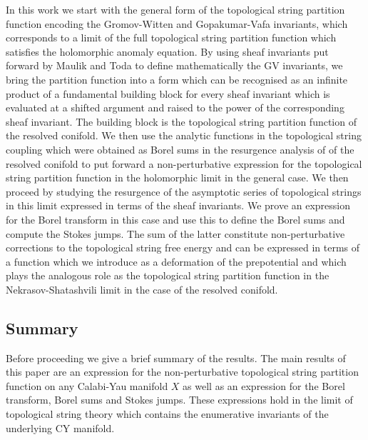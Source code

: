 \documentclass[a4paper,12pt,justification=centering]{article}
\numberwithin{equation}{section}
\theoremstyle{plain}%
\theoremstyle{definition}
\begin{document}
In this work we start with the general form of the topological string partition function encoding the Gromov-Witten and Gopakumar-Vafa invariants, which corresponds to a limit of the full topological string partition function which satisfies the holomorphic anomaly equation. By using sheaf invariants put forward by Maulik and Toda \cite{MaulikToda} to define mathematically the GV invariants, we bring the partition function into a form which can be recognised as an infinite product of a fundamental building block for every sheaf invariant which is evaluated at a shifted argument and raised to the power of the corresponding sheaf invariant. The building block is the topological string partition function of the resolved conifold. We then use the analytic functions in the topological string coupling which were obtained as Borel sums in the resurgence analysis of \cite{Alim:2021mhp} of the resolved conifold to put forward a non-perturbative expression for the topological string partition function in the holomorphic limit in the general case. We then proceed by studying the resurgence of the asymptotic series of topological strings in this limit expressed in terms of the sheaf invariants. We prove an expression for the Borel transform in this case and use this to define the Borel sums and compute the Stokes jumps. The sum of the latter constitute non-perturbative corrections to the topological string free energy and can be expressed in terms of a function which we introduce as a deformation of the prepotential and which plays the analogous role as the topological string partition function in the Nekrasov-Shatashvili limit \cite{Nekrasov:2009rc} in the case of the resolved conifold. 


\subsection{Summary}
Before proceeding we give a brief summary of the results. The main results of this paper are an expression for the non-perturbative topological string partition function on any Calabi-Yau manifold $X$ as well as an expression for the Borel transform, Borel sums and Stokes jumps. These expressions hold in the limit of topological string theory which contains the enumerative invariants of the underlying CY manifold.
\end{document}
